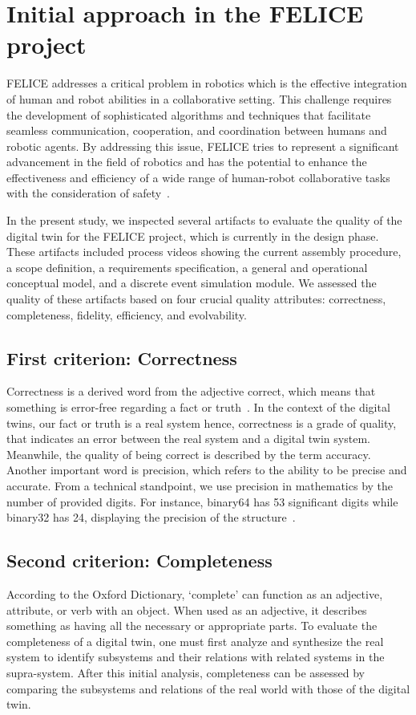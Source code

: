 \documentclass{llncs}
\begin{document}
    \section{Initial approach in the FELICE project}
    FELICE addresses a critical problem in robotics which is the effective integration of human and robot abilities in a collaborative setting. This challenge requires the development of sophisticated algorithms and techniques that facilitate seamless communication, 
    cooperation, and coordination between humans and robotic agents. By addressing this issue, FELICE tries to represent a 
    significant advancement in the field of robotics and has the potential to enhance the effectiveness and efficiency of a wide range of human-robot collaborative tasks with the consideration of safety~\cite{FELICE}.

    In the present study, we inspected several artifacts to evaluate the quality of the digital twin for the FELICE project, which is currently in the design phase. These artifacts included process videos showing the current assembly procedure, a scope definition, a requirements specification, a general and operational conceptual model, 
    and a discrete event simulation module. We assessed the quality of these artifacts based on four crucial quality attributes: correctness, completeness, fidelity, efficiency, and evolvability.

    \subsection{First criterion: Correctness}
    Correctness is a  derived word from the adjective correct, which means that something is error-free regarding a fact or truth~\cite{OxfordDictionary}. 
    In the context of the digital twins, our fact or truth is a real system hence, correctness is a grade of quality, that indicates an error between the real system and a digital twin system.
    Meanwhile, the quality of being correct is described by the term accuracy. Another important word is precision, 
    which refers to the ability to be precise and accurate\cite{OxfordDictionary}. 
    From a technical standpoint, we use precision in mathematics by the number of provided digits. 
    For instance, binary64 has 53 significant digits while binary32 has 24, displaying the precision of the structure~\cite{IEE754}.  
    
    \subsection{Second criterion: Completeness}
    According to the Oxford Dictionary, `complete'  can function as an adjective, attribute, or verb with an object\cite{OxfordDictionary}. When used as an adjective, it describes something 
    as having all the necessary or appropriate parts. To evaluate the completeness of a digital twin, 
    one must first analyze and synthesize the real system to identify subsystems and their relations with related systems in the supra-system. 
    After this initial analysis, completeness can be assessed by comparing the subsystems and relations of the real world with those of the digital twin.
\end{document}
